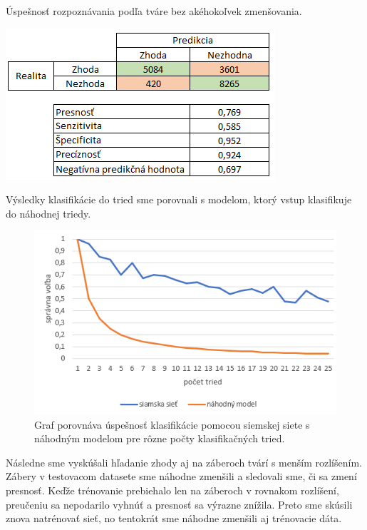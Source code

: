\begin{table}[H]
  \caption[Úspešnosť rozpoznávania podľa tváre]{Úspešnosť rozpoznávania podľa tváre bez akéhokoľvek zmenšovania.}
  \label{tbl:face1_table}
  \begin{center}
  \includegraphics{images/face1_table}
  \end{center}
\end{table}

Výsledky klasifikácie do tried sme porovnali s modelom, ktorý vstup klasifikuje do náhodnej triedy.

\begin{figure}[H]
\centerline{\includegraphics[width=1\textwidth]{images/graph_oneshot_face.png}}
\caption[Výsledky klasifikácie podľa tváre]{Graf porovnáva úspešnosť klasifikácie pomocou siemskej siete s náhodným modelom pre rôzne počty klasifikačných tried.}
\label{obr:graph_oneshot_face}
\end{figure}


Následne sme vyskúšali hľadanie zhody aj na záberoch tvárí s menším rozlíšením.
Zábery v testovacom datasete sme náhodne zmenšili a sledovali sme, či sa zmení presnosť.
Keďže trénovanie prebiehalo len na záberoch v rovnakom rozlíšení, preučeniu sa nepodarilo vyhnúť a presnosť sa výrazne znížila.
Preto sme skúsili znova natrénovať sieť, no tentokrát sme náhodne zmenšili aj trénovacie dáta.

